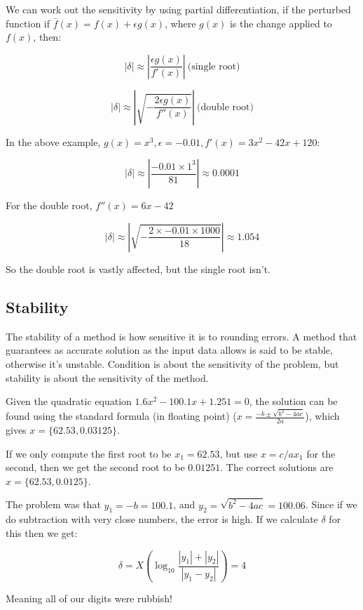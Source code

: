 We can work out the sensitivity by using partial differentiation, if the
perturbed function if $\bar{f}(x) = f(x) + \epsilon g(x)$, where $g(x)$ is the
change applied to $f(x)$, then:

\[
  |\delta| \approx |\frac{\epsilon g(x)}{f'(x)}|~\text{(single root)}
\]

\[
  |\delta| \approx |\sqrt{-\frac{2\epsilon g(x)}{f''(x)}}|~\text{(double root)}
\]

In the above example, $g(x) = x^3, \epsilon = -0.01, f'(x) = 3x^2 - 42x + 120$:

\[
  |\delta| \approx |\frac{-0.01 \times 1^3}{81}| \approx 0.0001
\]

For the double root, $f''(x) = 6x - 42$

\[
  |\delta| \approx |\sqrt{-\frac{2 \times -0.01 \times 1000}{18}}| \approx 1.054
\]

So the double root is vastly affected, but the single root isn't.

\subsection{Stability}

The stability of a method is how sensitive it is to rounding errors. A method
that guarantees as accurate solution as the input data allows is said to be
stable, otherwise it's unstable. Condition is about the sensitivity of the
problem, but stability is about the sensitivity of the method.

Given the quadratic equation $1.6x^2 - 100.1x + 1.251 = 0$, the solution can be
found using the standard formula (in floating point) ($x = \frac{-b \pm\sqrt{b^2
- 4ac}}{2a}$), which gives $x = \{62.53, 0.03125\}$.

If we only compute the first root to be $x_1 = 62.53$, but use $x = c/ax_1$ for
the second, then we get the second root to be $0.01251$. The correct solutions
are $x = \{62.53, 0.0125\}$.

The problem was that $y_1 = -b = 100.1$, and  $y_2 = \sqrt{b^2 - 4ac} = 100.06$.
Since if we do subtraction with very close numbers, the error is high. If we
calculate $\delta$ for this then we get:

\[
  \delta = X(\log_10\frac{|y_1| + |y_2|}{|y_1 - y_2|}) = 4
\]

Meaning all of our digits were rubbish!



